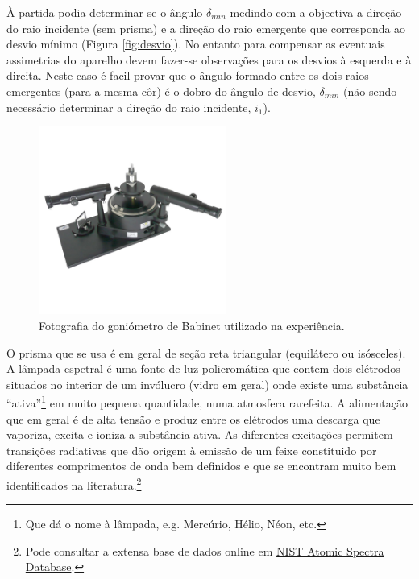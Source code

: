 \documentclass[a4paper,12pt]{article}  %
\begin{document}
À partida podia determinar-se  o ângulo $\delta_{min}$ medindo com a objectiva a direção do raio incidente (sem prisma) e a direção do raio emergente que corresponda ao desvio mínimo (Figura \ref{fig:desvio}). No entanto para compensar as eventuais assimetrias do aparelho devem fazer-se observações para os desvios à esquerda e à direita.
Neste caso é facil provar que o ângulo formado entre os dois raios emergentes (para a mesma côr) é o dobro do ângulo de desvio, $\delta_{min}$ (não sendo  necessário determinar a direção do raio incidente, $i_1$).


\begin{figure}[tb]  
\centering 
	\includegraphics[width=0.55\textwidth]{Espectrometro-Goniometro-S}
	\caption{Fotografia do goniómetro de Babinet utilizado na experiência. \label{fig:spectrometer}} 
\end{figure}




O prisma que se usa é em geral de seção reta triangular (equilátero ou isósceles).
A lâmpada espetral é uma fonte de luz policromática  que contem dois elétrodos situados no interior de um invólucro (vidro em geral) onde existe uma substância “ativa”\footnote{Que dá o nome à lâmpada, e.g. Mercúrio, Hélio, Néon, etc.} em muito pequena quantidade, numa atmosfera rarefeita. A alimentação que em geral é de alta tensão e produz entre os elétrodos uma descarga que vaporiza, excita e ioniza a substância ativa. As diferentes excitações permitem transições radiativas que dão origem à emissão de um feixe constituido por diferentes comprimentos de onda bem definidos e que se encontram muito bem identificados na literatura.\footnote{Pode consultar a extensa base de dados online em  \href{http://physics.nist.gov/asd}{NIST Atomic Spectra Database}.} 
\end{document}
